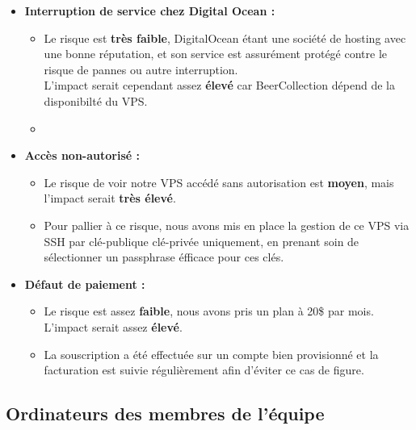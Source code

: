 \documentclass{report}
\begin{document}
			\begin{itemize}
				\item \textbf{Interruption de service chez Digital Ocean : }\\
					\begin{itemize}
						\item Le risque est \textbf{très faible}, DigitalOcean étant une société de hosting avec une bonne réputation, et son service est assurément protégé contre le risque de pannes ou autre interruption.\\
						L'impact serait cependant assez \textbf{élevé} car BeerCollection dépend de la disponibilté du VPS.\\
						\item
					\end{itemize}

				\item \textbf{Accès non-autorisé : }\\
					\begin{itemize}
						\item Le risque de voir notre VPS accédé sans autorisation est \textbf{moyen}, mais l'impact serait \textbf{très élevé}.\\
						\item Pour pallier à ce risque, nous avons mis en place la gestion de ce VPS via SSH par clé-publique clé-privée uniquement, en prenant soin de sélectionner un passphrase éfficace pour ces clés.\\
					\end{itemize}

				\item \textbf{Défaut de paiement : }\\
					\begin{itemize}
						\item Le risque est assez \textbf{faible}, nous avons pris un plan à 20\$ par mois. L'impact serait assez \textbf{élevé}.\\
						\item La souscription a été effectuée sur un compte bien provisionné et la facturation est suivie régulièrement afin d'éviter ce cas de figure.\\
					\end{itemize}
			\end{itemize}

		\subsection{Ordinateurs des membres de l'équipe}
\end{document}
